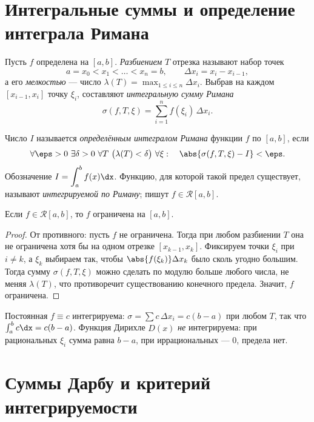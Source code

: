 \section{Интегральные суммы и определение интеграла Римана}

Пусть $f$ определена на $[a,b]$. \emph{Разбиением} $T$ отрезка называют набор точек
\[
  a=x_0<x_1<\dots<x_n=b,\qquad \Delta x_i=x_i-x_{i-1},
\]
а его \emph{мелкостью} — число $\lambda(T)=\max_{1\le i\le n}\Delta x_i$. Выбрав на каждом
$[x_{i-1},x_i]$ точку $\xi_i$, составляют \emph{интегральную сумму Римана}
\[
  \sigma(f,T,\xi)=\sum_{i=1}^{n} f(\xi_i)\,\Delta x_i .
\]

\begin{definition}
Число $I$ называется \emph{определённым интегралом Римана} функции $f$ по $[a,b]$, если
\[
  \forall\eps>0\ \exists\delta>0\ \forall T\ \bigl(\lambda(T)<\delta\bigr)\ \forall\xi:\quad
  \abs{\sigma(f,T,\xi)-I}<\eps .
\]
Обозначение $\displaystyle I=\int_a^b f(x)\dx$. Функцию, для которой такой предел существует,
называют \emph{интегрируемой по Риману}; пишут $f\in\mathcal R[a,b]$.
\end{definition}

\begin{theorem}
Если $f\in\mathcal R[a,b]$, то $f$ ограничена на $[a,b]$.
\end{theorem}

\begin{proof}
От противного: пусть $f$ не ограничена. Тогда при любом разбиении $T$ она не ограничена хотя бы
на одном отрезке $[x_{k-1},x_k]$. Фиксируем точки $\xi_i$ при $i\ne k$, а $\xi_k$ выбираем так,
чтобы $\abs{f(\xi_k)}\Delta x_k$ было сколь угодно большим. Тогда сумму $\sigma(f,T,\xi)$ можно
сделать по модулю больше любого числа, не меняя $\lambda(T)$, что противоречит существованию
конечного предела. Значит, $f$ ограничена.
\end{proof}

\begin{example}
Постоянная $f\equiv c$ интегрируема: $\sigma=\sum c\,\Delta x_i=c(b-a)$ при любом $T$, так что
$\int_a^b c\dx=c(b-a)$. Функция Дирихле $D(x)$ \emph{не} интегрируема: при рациональных $\xi_i$
сумма равна $b-a$, при иррациональных — $0$, предела нет.
\end{example}

\section{Суммы Дарбу и критерий интегрируемости}

